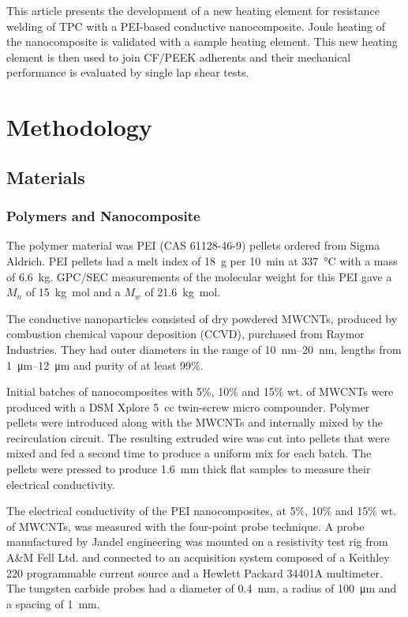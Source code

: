 \documentclass[11pt,review,times]{elsarticle}
\begin{document}
This article presents the development of a new heating element for resistance welding of TPC with a PEI-based conductive nanocomposite. 
Joule heating of the nanocomposite is validated with a sample heating element. 
This new heating element is then used to join CF/PEEK adherents and their mechanical performance is evaluated by single lap shear tests. 

							\section{Methodology}

\subsection{Materials}

\subsubsection{Polymers and Nanocomposite}

The polymer material was PEI (CAS 61128-46-9) pellets ordered from Sigma Aldrich. 
PEI pellets had a melt index of \SI{18}{\gram} per \SI{10}{\minute} at \SI{337}{\celsius} with a mass of \SI{6.6}{\kilogram}. 
GPC/SEC measurements of the molecular weight for this PEI gave a $M_n$ of \SI{15}{\kg\mol} and a $M_w$ of \SI{21.6}{\kg\mol}. 

The conductive nanoparticles consisted of dry powdered MWCNTs, produced by combustion chemical vapour deposition (CCVD), purchased from Raymor Industries. 
They had outer diameters in the range of \SIrange{10}{20}{\nano\metre}, lengths from \SIrange{1}{12}{\micro\metre} and purity of at least 99\%.

Initial batches of nanocomposites with 5\%, 10\% and 15\% wt. of MWCNTs were produced with a DSM Xplore 5~cc twin-screw micro compounder. 
Polymer pellets were introduced along with the MWCNTs and internally mixed by the recirculation circuit.
The resulting extruded wire was cut into pellets that were mixed and fed a second time to produce a uniform mix for each batch. 
The pellets were pressed to produce \SI{1.6}{\mm} thick flat samples to measure their electrical conductivity.  

The electrical conductivity of the PEI nanocomposites, at 5\%, 10\% and 15\% wt. of MWCNTs, was measured with the four-point probe technique. 
A probe manufactured by Jandel engineering was mounted on a resistivity test rig from A\&M Fell Ltd. and connected to an acquisition system composed of a Keithley 220 programmable current source and a Hewlett Packard 34401A multimeter. 
The tungsten carbide probes had a diameter of \SI{0.4}{\mm}, a radius of \SI{100}{\um} and a spacing of \SI{1}{\mm}. 
\end{document}
